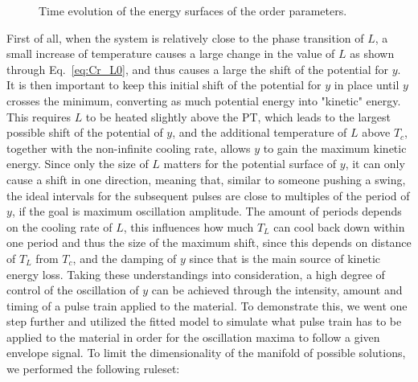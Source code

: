 \begin{figure}
	\begin{subfigure}{0.5\textwidth}
	\end{subfigure}
	\begin{subfigure}{0.5\textwidth}
	\end{subfigure}
	\caption{\label{fig:Cr_energy_surfaces} Time evolution of the energy surfaces of the order parameters.}
\end{figure}

First of all, when the system is relatively close to the phase transition of $L$, a small increase of temperature causes a large change in the value of $L$ as shown through Eq.~\ref{eq:Cr_L0}, and thus causes a large the shift of the potential for $y$. It is then important to keep this initial shift of the potential for $y$ in place until $y$ crosses the minimum, converting as much potential energy into "kinetic" energy. This requires $L$ to be heated slightly above the PT, which leads to the largest possible shift of the potential of $y$, and the additional temperature of $L$ above $T_c$, together with the non-infinite cooling rate, allows $y$ to gain the maximum kinetic energy. Since only the size of $L$ matters for the potential surface of $y$, it can only cause a shift in one direction, meaning that, similar to someone pushing a swing, the ideal intervals for the subsequent pulses are close to multiples of the period of $y$, if the goal is maximum oscillation amplitude.
The amount of periods depends on the cooling rate of $L$, this influences how much $T_L$ can cool back down within one period and thus the size of the maximum shift, since this depends on distance of $T_L$ from $T_c$, and the damping of $y$ since that is the main source of kinetic energy loss.
Taking these understandings into consideration, a high degree of control of the oscillation of $y$ can be achieved through the intensity, amount and timing of a pulse train applied to the material. To demonstrate this, we went one step further and utilized the fitted model to simulate what pulse train has to be applied to the material in order for the oscillation maxima to follow a given envelope signal. To limit the dimensionality of the manifold of possible solutions, we performed the following ruleset:
